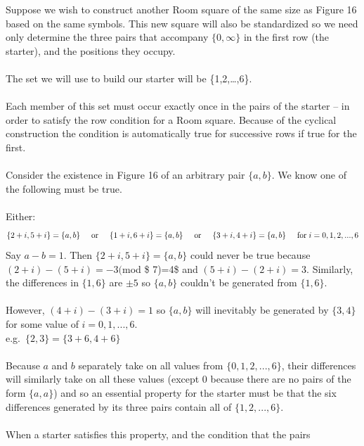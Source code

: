 \documentclass[
  12pt,
  a4paper]{book}
\begin{document}
Suppose we wish to construct another Room square of the same size as
Figure 16 based on the same symbols. This new square will also be
standardized so we need only determine the three pairs that accompany
\(\{0,\infty\}\) in the first row (the starter), and the positions they
occupy.\\
~\\
The set we will use to build our starter will be \{1,2,\ldots,6\}.\\
~\\
Each member of this set must occur exactly once in the pairs of the
starter -- in order to satisfy the row condition for a Room square.
Because of the cyclical construction the condition is automatically true
for successive rows if true for the first.\\
~\\
Consider the existence in Figure 16 of an arbitrary pair \(\{a,b\}\). We
know one of the following must be true.\\
~\\
Either:
\[\{2+i,5+i\}=\{a,b\} \hspace{0.5cm} \mathrm{or} \hspace{0.5cm} \{1+i,6+i\}=\{a,b\} \hspace{0.5cm} 
\mathrm{or} \hspace{0.5cm} \{3+i,4+i\}=\{a,b\} \hspace{0.5cm} \mathrm{for} \hspace{0.1cm} i=0,1,2,...,6\]
Say \(a-b=1\). Then \(\{2+i,5+i\}=\{a,b\}\) could never be true because
\((2+i)-(5+i)=-3(\)mod \$ 7)=4\$ and \((5+i)-(2+i)=3\). Similarly, the
differences in \(\{1,6\}\) are \(\pm5\) so \(\{a,b\}\) couldn't be
generated from \(\{1,6\}\).\\
~\\
However, \((4+i)-(3+i)=1\) so \(\{a,b\}\) will inevitably be generated
by \(\{3,4\}\) for some value of \(i=0,1,...,6\).\\
e.g.~\(\{2,3\}=\{3+6,4+6\}\)\\
~\\
Because \(a\) and \(b\) separately take on all values from
\(\{0,1,2,...,6\}\), their differences will similarly take on all these
values (except 0 because there are no pairs of the form \(\{a,a\}\)) and
so an essential property for the starter must be that the six
differences generated by its three pairs contain all of
\(\{1,2,...,6\}\).\\
~\\
When a starter satisfies this property, and the condition that the pairs
\end{document}
